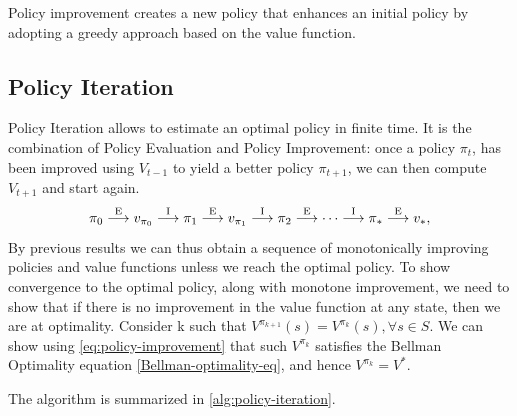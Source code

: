 
Policy improvement creates a new policy that enhances an initial policy by adopting a greedy approach 
based on the value function.

\subsection{Policy Iteration}
Policy Iteration allows to estimate an optimal policy in finite time. It is the combination of Policy 
Evaluation and Policy Improvement: once a policy $\pi_t$, has been improved using $V_{t-1}$ to yield 
a better policy $\pi_{t+1}$, we can then compute $V_{t+1}$ and start again. 
\[
\quad \pi_0 \stackrel{\rm E}{\longrightarrow} v_{\pi_0} \stackrel{\rm I}{\longrightarrow} \pi_1 \stackrel{\rm E}{\longrightarrow} v_{\pi_1} \stackrel{\rm I}{\longrightarrow} \pi_2 \stackrel{\rm E}{\longrightarrow} \cdots \stackrel{\rm I}{\longrightarrow} \pi_* \stackrel{\rm E}{\longrightarrow} v_*, \quad
\]
By previous results we can thus obtain a sequence of monotonically improving policies and value functions 
unless we reach the optimal policy.
To show convergence to the optimal policy, along with monotone
improvement, we need to show that if there is no improvement in the value function at any state, then we
are at optimality. Consider k such that 
$V^{\pi_{k+1}} (s) = V^{\pi_{k}}(s), \forall s \in S$. 
We can show using \cref{eq:policy-improvement} that such $V^{\pi_{k}}$ satisfies the Bellman Optimality equation 
\ref{Bellman-optimality-eq}, and hence $V^{\pi_{k}} = V^*$.

The algorithm is summarized in \ref{alg:policy-iteration}.



